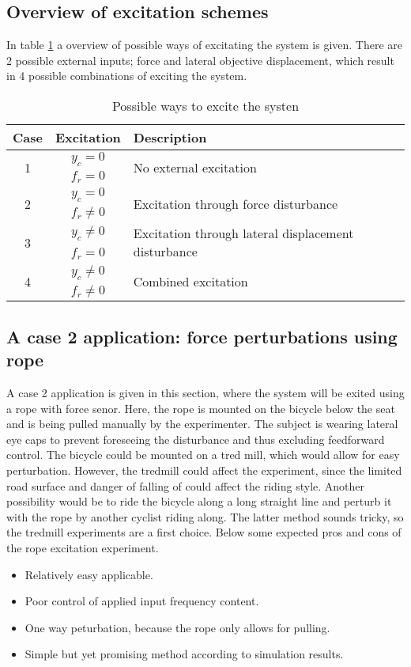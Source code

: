 \subsection{Overview of excitation schemes}
In table \ref{table:excitationscheme} a overview of possible ways of excitating the system is given. There are 2 possible external inputs; force and lateral objective displacement, which result in 4  possible combinations of exciting the system. 
\begin{table}
		\centering
		\begin{tabular}{c c l}
				\toprule
				Case & Excitation  & Description \\
				\midrule
				\multirow{2}{*}{1}
						& $y_c= 0$ 			&  \multirow{2}{*}{No external excitation} \\
						& $f_r = 0$ 			  & \\	\hline
				\multirow{2}{*}{2}
						& $y_c = 0$ 		  & \multirow{2}{*}{Excitation through force disturbance} \\
						& $f_r\neq0$ 		  & \\	\hline
				\multirow{2}{*}{3}
						& $y_c \neq 0$  & \multirow{2}{*}{Excitation through lateral displacement disturbance} \\
						& $f_r = 0$ 			  & \\	\hline
					\multirow{2}{*}{4}
						& $y_c \neq 0$  & \multirow{2}{*}{Combined excitation} \\
						& $f_r   \neq 0$  & \\
				\bottomrule
		\end{tabular}
		\caption{Possible ways to excite the systen}
		\label{table:excitationscheme}
\end{table}
\subsection{A case 2 application: force perturbations using rope}
A case 2 application is given in this section, where the system will be exited using a rope with force senor. Here, the rope is mounted on the bicycle below the seat and is being pulled manually by the experimenter. The subject is wearing lateral eye caps to prevent foreseeing the disturbance and thus excluding feedforward control. 
		The bicycle could be mounted on a tred mill, which would allow for easy perturbation. However, the tredmill could affect the experiment, since the limited road surface and danger of falling of could affect the riding style. Another possibility would be to ride the bicycle along a long straight line and perturb it with the rope by another cyclist riding along. The latter method sounds tricky, so the tredmill experiments are a first choice. Below some expected pros and cons of the rope excitation experiment.
\begin{itemize}
		\item Relatively easy applicable.
		\item Poor control of applied input frequency content.
		\item One way peturbation, because the rope only allows for pulling.
		\item Simple but yet promising method according to simulation results.
\end{itemize}

